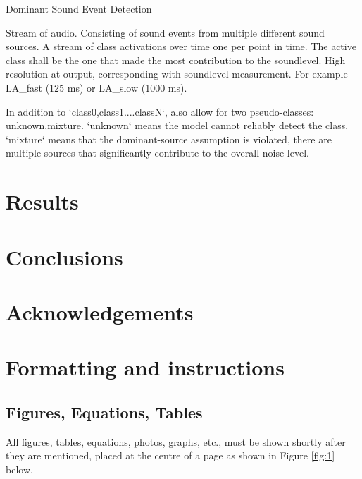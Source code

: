 \documentclass[a4paper,12pt]{article}
\begin{document}
\begin{algorithm}
\caption{Dominant Sound Event Detection}\label{alg:cap}
\begin{algorithmic}
\Require Stream of audio.
Consisting of sound events from multiple different sound sources.
\Ensure A stream of class activations over time one per point in time.
The active class shall be the one that made the most contribution to the soundlevel.
High resolution at output, corresponding with soundlevel measurement. For example LA_fast (125 ms) or LA_slow (1000 ms).
\end{algorithmic}
\end{algorithm}

In addition to `{class0,class1....classN}`, also allow for two pseudo-classes: {unknown,mixture}. `unknown` means the model cannot reliably detect the class.
`mixture` means that the dominant-source assumption is violated,
there are multiple sources that significantly contribute to the overall noise level.

\clearpage
\section{Results}
\noindent


\section{Conclusions}
\noindent

\section*{Acknowledgements}
\noindent


\clearpage
\section{Formatting and instructions}

\subsection{Figures, Equations, Tables}
\noindent
All figures, tables, equations, photos, graphs, etc., must be shown shortly after they are mentioned, placed at the centre of a page as shown in Figure \ref{fig:1} below.
\end{document}
